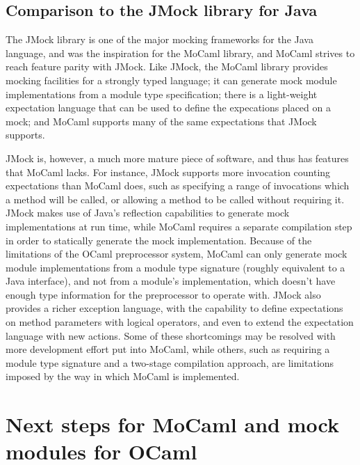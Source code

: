 \subsection{Comparison to the JMock library for Java}


The JMock library \cite{freeman:evolving} \cite{freeman:growing}
\cite{www:jmock} is one of the major mocking frameworks for the Java
language, and was the inspiration for the MoCaml library, and MoCaml
strives to reach feature parity with JMock. Like JMock, the MoCaml
library provides mocking facilities for a strongly typed language; it
can generate mock module implementations from a module type
specification; there is a light-weight expectation language that can
be used to define the expecations placed on a mock; and MoCaml
supports many of the same expectations that JMock supports.


JMock is, however, a much more mature piece of software, and thus has
features that MoCaml lacks. For instance, JMock supports more
invocation counting expectations than MoCaml does, such as specifying
a range of invocations which a method will be called, or allowing a
method to be called without requiring it. JMock makes use of Java's
reflection capabilities to generate mock implementations at run time,
while MoCaml requires a separate compilation step in order to
statically generate the mock implementation. Because of the
limitations of the OCaml preprocessor system, MoCaml can only generate
mock module implementations from a module type signature (roughly
equivalent to a Java interface), and not from a module's
implementation, which doesn't have enough type information for the
preprocessor to operate with. JMock also provides a richer exception
language, with the capability to define expectations on method
parameters with logical operators, and even to extend the expectation
language with new actions. Some of these shortcomings may be resolved
with more development effort put into MoCaml, while others, such as
requiring a module type signature and a two-stage compilation
approach, are limitations imposed by the way in which MoCaml is
implemented.

\section{Next steps for MoCaml and mock modules for OCaml}

